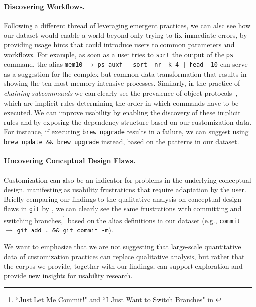 \documentclass[smallextended,natbib]{svjour3}
\newcommand{\alias}[2]{{\texttt{#1} $\rightarrow$ \texttt{#2}}}
\newcommand{\cmd}[1]{{\texttt{#1}}}
\begin{document}
\paragraph{Discovering Workflows.}
Following a different thread of leveraging emergent practices, we can also see how our dataset would enable a world beyond only trying to fix immediate errors, by providing usage hints that could introduce users to common parameters and workflows.
For example, as soon as a user tries to \cmd{sort} the output of the \cmd{ps} command, the alias \alias{mem10}{ps auxf | sort -nr -k 4 | head -10} can serve as a suggestion for the complex but common data transformation that results in showing the ten most memory-intensive processes.
Similarly, in the practice of \emph{chaining subcommands} we can clearly see the prevalence of object protocols~\citep{beckman:11}, which are implicit rules determining the order in which commands have to be executed.
We can improve usability by enabling the discovery of these implicit rules and by exposing the dependency structure based on our customization data.
For instance, if executing \verb|brew upgrade| results in a failure, we can suggest using \verb|brew update && brew upgrade| instead, based on the patterns in our dataset. 

\paragraph{Uncovering Conceptual Design Flaws.}

Customization can also be an indicator for problems in the underlying conceptual design, manifesting as usability frustrations that require adaptation by the user.
Briefly comparing our findings to the qualitative analysis on conceptual design flaws in \cmd{git} by \cite{perez:13}, we can clearly see the same frustrations with committing and switching branches,\footnote{``Just Let Me Commit!" and ``I Just Want to Switch Branches" in \cite{perez:13}} based on the alias definitions in our dataset (e.g., \alias{commit}{git add . \&\& git commit -m}).

We want to emphasize that we are not suggesting that large-scale quantitative data of customization practices can replace qualitative analysis, but rather that the corpus we provide, together with our findings, can support exploration and provide new insights for usability research.
\end{document}
